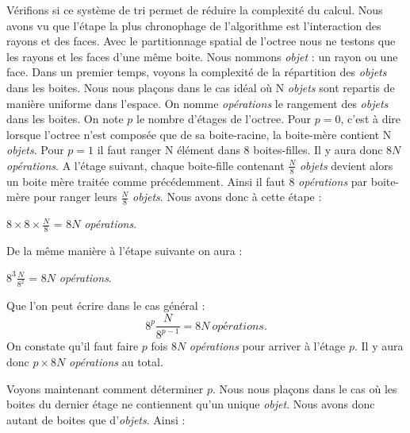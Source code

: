 Vérifions si ce système de tri permet de réduire la complexité du calcul. Nous avons vu que l'étape la plus chronophage de l'algorithme est l'interaction des rayons et des faces. Avec le partitionnage spatial de l'\gls{octree} nous ne testons que les rayons et les faces d'une même boite. Nous nommons \textit{objet} : un rayon ou une face. Dans un premier temps, voyons la complexité de la répartition des \textit{objets} dans les boites. Nous nous plaçons dans le cas idéal où N \textit{objets} sont repartis de manière uniforme dans l'espace. On nomme \textit{opérations} le rangement des \textit{objets} dans les boites. On note $p$ le nombre d'étages de l'\gls{octree}. Pour $p=0$, c'est à dire lorsque l'\gls{octree} n'est composée que de sa boite-racine, la boite-mère contient N \textit{objets}. Pour $p=1$ il faut ranger N élément dans 8 boites-filles. Il y aura donc $8N$ \textit{opérations}. A l'étage suivant, chaque boite-fille contenant $\frac{N}{8}$ \textit{objets} devient alors un boite mère traitée comme précédemment. Ainsi il faut $8$ \textit{opérations} par boite-mère pour ranger leurs $\frac{N}{8}$ \textit{objets}. Nous avons donc à cette étape :
%
\begin{center}
$8\times 8\times \frac{N}{8}$ = $8N$ \textit{opérations}.
\end{center}
%
De la même manière à l'étape suivante on aura :
\begin{center}
$8^3\frac{N}{8^2}$ = $8N$ \textit{opérations}.
\end{center}
%
Que l'on peut écrire dans le cas général :
\begin{equation} \label{operation}
8^p\frac{N}{8^{p-1}} = 8N \ \textit{opérations}.
\end{equation}
%
On constate qu'il faut faire $p$ fois $8N$ \textit{opérations} pour arriver à l'étage $p$. Il y aura donc $p \times 8N$ \textit{opérations} au total. %

Voyons maintenant comment déterminer $p$. Nous nous plaçons dans le cas où les boites du dernier étage ne contiennent qu'un unique \textit{objet}. Nous avons donc autant de boites que d'\textit{objets}. Ainsi :

